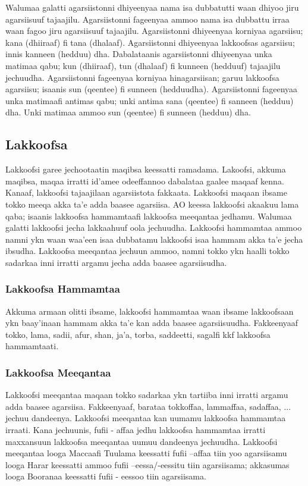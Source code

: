 \documentclass[11pt,b5paper]{book}
\begin{document}
Walumaa galatti agarsiistonni dhiyeenyaa nama isa dubbatutti waan dhiyoo jiru agarsiisuuf tajaajilu. Agarsiistonni fageenyaa ammoo nama isa dubbattu irraa waan fagoo jiru agarsiisuuf tajaajilu. Agarsiistonni dhiyeenyaa korniyaa agarsiisu; kana (dhiiraaf) fi tana (dhalaaf). Agarsiistonni dhiyeenyaa lakkoofsas agarsiisu; innis kanneen (hedduu) dha. Dabalataanis agarsiistonni dhiyeenyaa unka matimaa qabu; kun (dhiiraaf), tun (dhalaaf) fi kunneen (hedduuf) tajaajilu jechuudha. Agarsiistonni fageenyaa korniyaa hinagarsiisan; garuu lakkoofsa agarsiisu; isaanis sun (qeentee) fi sunneen (hedduudha). Agarsiistonni fageenyaa unka matimaafi antimas qabu; unki antima sana (qeentee) fi sanneen (hedduu) dha. Unki matimaa ammoo sun (qeentee) fi sunneen (hedduu) dha.

\subsection{Lakkoofsa}

Lakkoofsi garee jechootaatin maqibsa keessatti ramadama. Lakoofsi, akkuma maqibsa, maqaa irratti id'amee odeeffannoo
dabalataa gaalee maqaaf kenna. Kanaaf, lakkoofsi tajaajilaan agarsiistota fakkaata. Lakkoofsi maqaan ibsame tokko meeqa akka ta'e adda baasee agarsiisa. AO keessa lakkoofsi akaakuu lama qaba; isaanis lakkoofsa hammamtaafi lakkoofsa meeqantaa jedhamu. Walumaa galatti lakkoofsi jecha lakkaahuuf oola jechuudha. Lakkoofsi hammamtaa ammoo
namni ykn waan waa'een isaa dubbatamu lakkoofsi isaa hammam akka ta'e jecha ibsudha. Lakkoofsa meeqantaa jechuun ammoo, namni tokko ykn haalli tokko sadarkaa inni irratti argamu jecha adda baasee agarsiisudha. 

\subsubsection{Lakkoofsa Hammamtaa}

Akkuma armaan olitti ibsame, lakkoofsi hammamtaa waan ibsame lakkoofsaan ykn baay'inaan hammam akka ta'e kan adda baasee agarsiisuudha. Fakkeenyaaf tokko, lama, sadii, afur, shan, ja'a, torba, saddeetti, sagalfi kkf lakkoofsa hammamtaati.

\subsubsection{Lakkoofsa Meeqantaa}
Lakkoofsi meeqantaa maqaan tokko sadarkaa ykn tartiiba inni irratti argamu adda baasee agarsiisa. Fakkeenyaaf, barataa tokkoffaa, lammaffaa, sadaffaa, ... jechuu dandeenya. Lakkoofsi meeqantaa kan uumamu lakkoofsa hammamtaa
irraati. Kana jechuunis, fufii - affaa jedhu lakkoofsa hammamtaa irratti maxxansuun lakkoofsa meeqantaa uumuu
dandeenya jechuudha. Lakkoofsi meeqantaa looga Maccaafi Tuulama keessatti fufii –affaa tiin yoo agarsiisamu looga Harar keessatti ammoo fufii –eessa/-eessitu tiin agarsiisama; akkasumas looga Booranaa keessatti fufii -
eessoo tiin agarsiisama\cite{owens1985grammar,griefenow2001grammatical}. 
\end{document}
